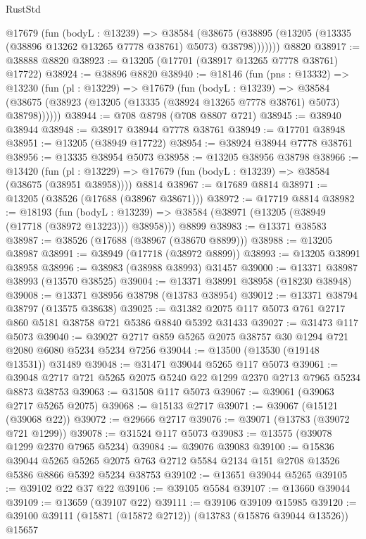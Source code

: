 \begin{lexlean}{RustStd}
\begin{coremodule}
        @17679
          (fun (bodyL : @13239) =>
          @38584
            (@38675 (@38895 (@13205 (@13335 (@38896 @13262 @13265 @7778 @38761) @5073) @38798)))))))
    @8820
@38917 := @38888 @8820
@38923 := @13205 (@17701 (@38917 @13265 @7778 @38761) @17722)
@38924 := @38896 @8820
@38940 := @18146
    (fun (pns : @13332) =>
    @13230
      (fun (pl : @13229) =>
      @17679
        (fun (bodyL : @13239) =>
        @38584 (@38675 (@38923 (@13205 (@13335 (@38924 @13265 @7778 @38761) @5073) @38798))))))
@38944 := @708 @8798 (@708 @8807 @721)
@38945 := @38940 @38944
@38948 := @38917 @38944 @7778 @38761
@38949 := @17701 @38948
@38951 := @13205 (@38949 @17722)
@38954 := @38924 @38944 @7778 @38761
@38956 := @13335 @38954 @5073
@38958 := @13205 @38956 @38798
@38966 := @13420
    (fun (pl : @13229) => @17679 (fun (bodyL : @13239) => @38584 (@38675 (@38951 @38958))))
    @8814
@38967 := @17689 @8814
@38971 := @13205 (@38526 (@17688 (@38967 @38671)))
@38972 := @17719 @8814
@38982 := @18193
    (fun (bodyL : @13239) => @38584 (@38971 (@13205 (@38949 (@17718 (@38972 @13223))) @38958)))
    @8899
@38983 := @13371 @38583
@38987 := @38526 (@17688 (@38967 (@38670 @8899)))
@38988 := @13205 @38987
@38991 := @38949 (@17718 (@38972 @8899))
@38993 := @13205 @38991 @38958
@38996 := @38983 (@38988 @38993) @31457
@39000 := @13371 @38987 @38993 (@13570 @38525)
@39004 := @13371 @38991 @38958 (@18230 @38948)
@39008 := @13371 @38956 @38798 (@13783 @38954)
@39012 := @13371 @38794 @38797 (@13575 @38638)
@39025 := @31382 @2075 @117 @5073 @761 @2717 @860 @5181 @38758 @721 @5386 @8840 @5392 @31433
@39027 := @31473 @117 @5073
@39040 := @39027 @2717 @859 @5265 @2075 @38757 @30 @1294 @721 @2080 @6080 @5234 @5234 @7256
@39044 := @13500 (@13530 (@19148 @13531)) @31489
@39048 := @31471 @39044 @5265 @117 @5073
@39061 := @39048 @2717 @721 @5265 @2075 @5240 @22 @1299 @2370 @2713 @7965 @5234 @8873 @38753
@39063 := @31508 @117 @5073
@39067 := @39061 (@39063 @2717 @5265 @2075)
@39068 := @15133 @2717
@39071 := @39067 (@15121 (@39068 @22))
@39072 := @29666 @2717
@39076 := @39071 (@13783 (@39072 @721 @1299))
@39078 := @31524 @117 @5073
@39083 := @13575 (@39078 @1299 @2370 @7965 @5234)
@39084 := @39076 @39083
@39100 := @15836
    @39044
    @5265
    @5265
    @2075
    @763
    @2712
    @5584
    @2134
    @151
    @2708
    @13526
    @5386
    @8866
    @5392
    @5234
    @38753
@39102 := @13651 @39044 @5265
@39105 := @39102 @22 @37 @22
@39106 := @39105 @5584
@39107 := @13660 @39044
@39109 := @13659 (@39107 @22)
@39111 := @39106 @39109 @15985
@39120 := @39100 @39111 (@15871 (@15872 @2712)) (@13783 (@15876 @39044 @13526)) @15657

\end{coremodule}
\end{lexlean}
